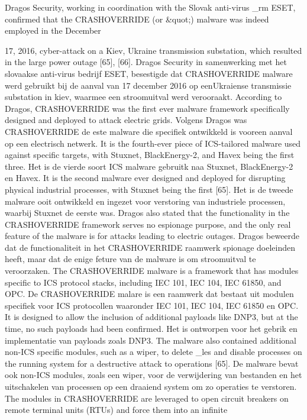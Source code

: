 {Dragos Security, working in coordination with the Slovak anti-virus _rm ESET, confirmed that
the CRASHOVERRIDE (or \Industroyer&quot;) malware was indeed employed in the December

17, 2016, cyber-attack on a Kiev, Ukraine transmission substation, which resulted in the
large power outage [65], [66]. Dragos Security in samenwerking met het slovaakse anti-virus
bedrijf ESET, besestigde dat CRASHOVERRIDE malware werd gebruikt bij de aanval van 17
december 2016 op eenUkraiense transmissie substation in kiev, waarmee een stroomuitval
werd verooraakt.
According to Dragos, CRASHOVERRIDE was the first ever malware framework specifically
designed and deployed to attack electric grids. Volgens Dragos was CRASHOVERRIDE de
este malware die specifiek ontwikkeld is vooreen aanval op een electrisch netwerk.
It is the fourth-ever piece of ICS-tailored malware used against specific targets, with Stuxnet,
BlackEnergy-2, and Havex being the first three. Het is de vierde soort ICS malware gebruitk
naa Stuxnet, BlackEnergy-2 en Havex.
It is the second malware ever designed and deployed for disrupting physical industrial
processes, with Stuxnet being the first [65]. Het is de tweede malware ooit ontwikkeld en
ingezet voor verstoring van industriele processen, waarbij Stuxnet de eerste was.
Dragos also stated that the functionality in the CRASHOVERRIDE framework serves no
espionage purpose, and the only real feature of the malware is for attacks leading to electric
outages. Dragos beweerde dat de functionaliteit in het CRASHOVERRIDE raamwerk
spionage doeleinden heeft, maar dat de enige feture van de malware is om stroomuitval te
veroorzaken.
The CRASHOVERRIDE malware is a framework that has modules specific to ICS protocol
stacks, including IEC 101, IEC 104, IEC 61850, and OPC. De CRASHOVERRIDE malare is
een raamwerk dat bestaat uit modulen specifiek voor ICS protocollen waaronder IEC 101,
IEC 104, IEC 61850 en OPC.
It is designed to allow the inclusion of additional payloads
like DNP3, but at the time, no such payloads had been confirmed. Het is ontworpen voor het
gebrik en implementatie van payloads zoals DNP3.
The malware also contained additional non-ICS specific modules, such as a
wiper, to delete _les and disable processes on the running system for a
destructive attack to operations [65]. De malware bevat ook non-ICS modules, zoals een
wiper, voor de verwijdering van bestanden en het uitschakelen van processen op een
draaiend system om zo operaties te verstoren.
The modules in CRASHOVERRIDE are leveraged to open circuit
breakers on remote terminal units (RTUs) and force them into an infinite
}
